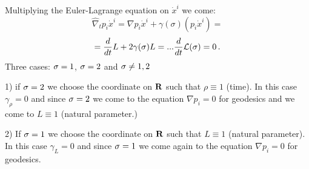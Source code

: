 Multiplying the Euler-Lagrange equation on $\dot x^i$ we come:
                   $$
    \widehat\nabla_t p_i \dot x^i=\nabla p_i\dot x^i+\gamma(\sigma)(p_i\dot x^i)=
                   $$ 
        $$
      ={d\over dt}L+2\gamma(\sigma)L=... {d\over dt}{\cal L}(\sigma)=0\,.
        $$
        Three cases: $\sigma=1$, $\sigma=2$ and $\sigma\not=1,2$

1) if $\sigma=2$ we choose the coordinate on ${\bf R}$ such that $\rho\equiv 1$ (time). In this case $\gamma_\rho=0$
and since $\sigma=2$ we come to the equation $\nabla p_i=0$ for geodesics and we come to $L\equiv 1$ (natural parameter.)

2) If $\sigma=1$  we choose the coordinate on ${\bf R}$ such that $L\equiv 1$ (natural parameter). In this case $\gamma_L=0$
and since $\sigma=1$ we come again to the equation $\nabla p_i=0$ for geodesics.


\bye
